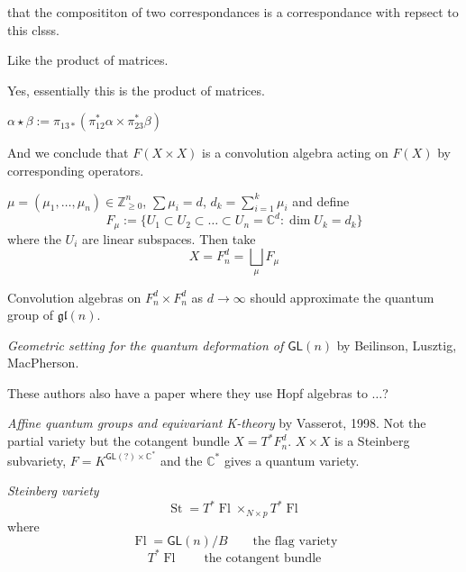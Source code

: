 \medskip{}
that the composititon of two correspondances
is a correspondance with repsect to this
clsss.

\begin{remark}[Altan]
\label{remark-mazin-matrices}
Like the product of matrices.
\end{remark}

Yes, essentially this is the product of
matrices.

\begin{definition}[Convolution]
\label{definition-mazin-convolution}
$\alpha \star
\beta:=\pi_{13*}(\pi_{12}^*\alpha\times
\pi_{23}^*\beta)$
\end{definition}
And we conclude that $F(X\times X)$ is a
convolution algebra acting on $F(X)$ by
corresponding operators.

\medskip{}
$\mu=(\mu_1,\ldots,\mu_n)\in\mathbb{Z}_{\geq
0}^n$, $\sum \mu_i=d$,
$d_k=\sum_{i=1}^k\mu_i$
and define
$$F_\mu:=\{U_1\subset U_2\subset\ldots
\subset U_n=\mathbb{C}^{d}:\dim U_k=d_k\}$$
where the $U_i$ are linear subspaces. Then
take
$$X=F_n^d=\bigsqcup_\mu F_\mu$$

\medskip{}
Convolution algebras on $F_n^d\times F_n^d$
as $d\to \infty$ should approximate the
quantum group of $\mathfrak{gl}(n)$.

\medskip{}
{\it Geometric setting for the quantum
deformation of $\mathsf{GL}(n)$} by
Beilinson, Lusztig, MacPherson.

\begin{remark}[Altan]
\label{remark-mazin-altan-hopf}
These authors also have a paper where they
use Hopf algebras to $\ldots$?
\end{remark}

\medskip{}
{\it Affine quantum groups and equivariant
K-theory} by Vasserot, 1998. Not the partial
variety but the cotangent bundle
$X=T^*F_n^d$. $X\times X$ is a Steinberg
subvariety, $F=K^{\mathsf{GL}(?)\times
\mathbb{C}^{*}}$ and the $\mathbb{C}^*$ gives
a quantum variety.

\begin{definition}[Altan]
\label{definition-mazin-steinberg}
{\it Steinberg variety}
$$\operatorname{St}=T^*\operatorname{Fl}
\times_{N\times
p}T^*\operatorname{Fl}$$
where
$$\operatorname{Fl}=\mathsf{GL}(n)/B\qquad
\text{the flag variety}$$
$$T^*\operatorname{Fl}\qquad \text{the
cotangent bundle}$$
\end{definition}

